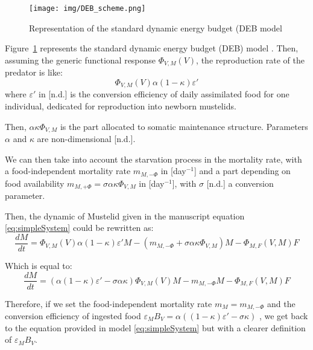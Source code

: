 \documentclass[11pt]{article}
\begin{document}
\begin{figure}[!htb]
	\begin{center}
		\texttt{[image: img/DEB\_scheme.png]}
		\caption{Representation of the standard dynamic energy budget (DEB model \citep{Sousa2010}}
		\label{fig:DEB_scheme}
	\end{center}
\end{figure}

Figure~\ref{fig:DEB_scheme} represents the standard dynamic energy budget (DEB) model \citep{Sousa2010}.
%
Then, assuming the generic functional response $\Phi_{V,M}(V)$, the reproduction rate of the predator is like:
\begin{equation}
\Phi_{V,M}(V) \alpha (1 - \kappa) \varepsilon'
\end{equation}
where $\varepsilon'$ in [n.d.] is the conversion efficiency of daily assimilated food for one individual, dedicated for reproduction into newborn mustelids.

Then, $\alpha \kappa \Phi_{V,M}$ is the part allocated to somatic maintenance structure. Parameters $\alpha$ and $\kappa$ are non-dimensional [n.d.].

We can then take into account the starvation process in the mortality rate, with a food-independent mortality rate $m_{M, -\Phi}$ in [day$^{-1}$] and a part depending on food availability $m_{M, +\Phi} = \sigma \alpha \kappa \Phi_{V,M}$ in [day$^{-1}$], with $\sigma$ [n.d.] a conversion parameter.


Then, the dynamic of Mustelid given in the manuscript equation \eqref{eq:simpleSystem} could be rewritten as:
\begin{equation}
\frac{dM}{dt} = \Phi_{V,M}(V) \alpha (1 - \kappa) \varepsilon' M - \left( m_{M, -\Phi}  + \sigma \alpha \kappa \Phi_{V,M} \right) M - \Phi_{M,F}(V, M) F
\end{equation}

Which is equal to:
\begin{equation}
\frac{dM}{dt} = \left(\alpha (1 - \kappa) \varepsilon' - \sigma \alpha \kappa  \right) \Phi_{V,M}(V)  M - m_{M, -\Phi}  M  - \Phi_{M,F}(V, M) F
\end{equation}

Therefore, if we set  the food-independent mortality rate $m_M = m_{M, -\Phi}$ and the conversion efficiency of ingested food $\varepsilon_M B_V=\alpha ((1 - \kappa) \varepsilon' - \sigma  \kappa ) $ , we get back to the equation provided in model \eqref{eq:simpleSystem} but with a clearer definition of $\varepsilon_M B_V$.
\end{document}
